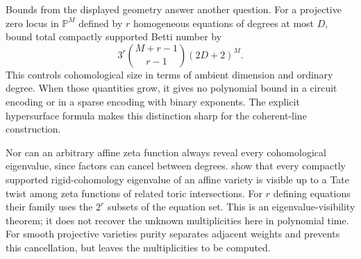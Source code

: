 Bounds from the displayed geometry answer another question. For a projective zero locus in $\mathbb P^M$ defined by $r$ homogeneous equations of degrees at most $D$, \citet[Corollary~5.5.8, p.~38]{root-wz-betti} bound total compactly supported Betti number by
\[
 3^r\binom{M+r-1}{r-1}(2D+2)^M.
\]
This controls cohomological size in terms of ambient dimension and ordinary degree. When those quantities grow, it gives no polynomial bound in a circuit encoding or in a sparse encoding with binary exponents. The explicit hypersurface formula makes this distinction sharp for the coherent-line construction.

Nor can an arbitrary affine zeta function always reveal every cohomological eigenvalue, since factors can cancel between degrees. \citet[Theorem~1.3, p.~2 of the author manuscript]{root-wz-visibility} show that every compactly supported rigid-cohomology eigenvalue of an affine variety is visible up to a Tate twist among zeta functions of related toric intersections. For $r$ defining equations their family uses the $2^r$ subsets of the equation set. This is an eigenvalue-visibility theorem; it does not recover the unknown multiplicities here in polynomial time. For smooth projective varieties purity separates adjacent weights and prevents this cancellation, but leaves the multiplicities to be computed.

